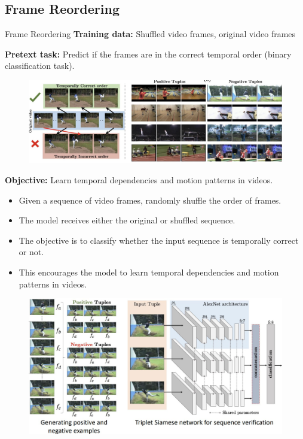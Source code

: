 \subsection{Frame Reordering}
\begin{frame}[allowframebreaks]{Frame Reordering}
    \textbf{Training data:} Shuffled video frames, original video frames

    \textbf{Pretext task:} Predict if the frames are in the correct temporal order (binary classification task).

    \begin{figure}
        \centering
        \includegraphics[width=1\textwidth,height=0.6\textheight,keepaspectratio]{images/video/slide_44_1_img.jpg}
    \end{figure}
\framebreak
    \textbf{Objective:} Learn temporal dependencies and motion patterns in videos.
    \begin{itemize}
        \item Given a sequence of video frames, randomly shuffle the order of frames.
        \item The model receives either the original or shuffled sequence.
        \item The objective is to classify whether the input sequence is temporally correct or not.
        \item This encourages the model to learn temporal dependencies and motion patterns in videos.
    \end{itemize}
\framebreak
    \begin{figure}
        \centering
        \includegraphics[width=1\textwidth,height=0.9\textheight,keepaspectratio]{images/video/slide_45_1_img.jpg}

\end{figure}
\end{frame}
